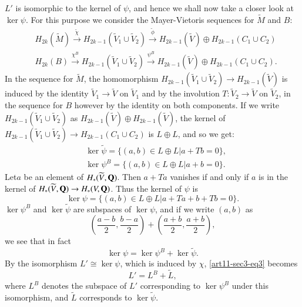 $L'$ is isomorphic to the kernel of $\psi$, and hence we shall now take a closer look at $\ker \psi$. For this purpose we consider the Mayer-Vietoris sequences for $\widetilde{M}$ and $B$:
\begin{align*}
& H_{2k}(\widetilde{M})\xrightarrow{\widetilde{\chi}}H_{2k-1}(\widetilde{V}_{1}\cup \widetilde{V}_{2})\xrightarrow{\widetilde{\phi}}H_{2k-1}(\widetilde{V})\oplus H_{2k-1}(C_{1}\cup C_{2})\\[4pt]
& H_{2k}(B)\xrightarrow{\chi^{B}}H_{2k-1}(\widetilde{V}_{1}\cup \widetilde{V}_{2})\xrightarrow{\psi^{B}}H_{2k-1}(\widetilde{V})\oplus H_{2k-1}(C_{1}\cup C_{2}).
\end{align*}
In the sequence for $\widetilde{M}$, the homomorphism $H_{2k-1}(\widetilde{V}_{1}\cup \widetilde{V}_{2})\to H_{2k-1}(\widetilde{V})$ is induced by the identity $\widetilde{V}_{1}\to \widetilde{V}$ on $\widetilde{V}_{1}$ and by the involution $T:\widetilde{V}_{2}\to \widetilde{V}$ on $\widetilde{V}_{2}$, in the sequence for $B$ however by the identity on both components. If we write $H_{2k-1}(\widetilde{V}_{1}\cup \widetilde{V}_{2})$ as $H_{2k-1}(\widetilde{V})\oplus H_{2k-1}(\widetilde{V})$, the kernel of $H_{2k-1}(\widetilde{V}_{1}\cup \widetilde{V}_{2})\to H_{2k-1}(C_{1}\cup C_{2})$ is $L\oplus L$, and so we get:
\begin{align*}
&\ker \widetilde{\psi}=\{(a,b)\in L\oplus L | a+Tb=0\},\\
&\ker \psi^{B}=\{(a,b)\in L\oplus L | a+b=0\}.
\end{align*}
Let\pageoriginale $a$ be an element of $H_{*}(\widetilde{V},\mathbf{Q})$. Then $a+Ta$ vanishes if and only if $a$ is in the kernel of $H_{*}(\widetilde{V},\mathbf{Q})\to H_{*}(V,\mathbf{Q})$. Thus the kernel of $\psi$ is
$$
\ker \psi=\{(a,b)\in L\oplus L |a+Ta+b+Tb=0\}.
$$
$\ker \psi^{B}$ and $\ker \widetilde{\psi}$ are subspaces of $\ker \psi$, and if we write $(a,b)$ as 
$$
\left(\dfrac{a-b}{2},\dfrac{b-a}{2}\right)+\left(\dfrac{a+b}{2},\dfrac{a+b}{2}\right),
$$ 
we see that in fact
\begin{equation}
\ker \psi = \ker \psi^{B}+\ker \widetilde{\psi}.\label{art11-sec3-eq3}
\end{equation}
By the isomorphism $L'\cong \ker \psi$, which is induced by $\chi$, \eqref{art11-sec3-eq3} becomes
$$
L'=L^{B}+\widetilde{L},
$$
where $L^{B}$ denotes the subspace of $L'$ corresponding to $\ker \psi^{B}$ under this isomorphism, and $\widetilde{L}$ corresponds to $\ker \widetilde{\psi}$.

